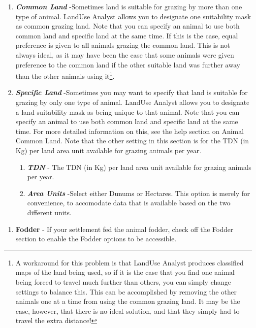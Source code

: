 \begin{enumerate}
      \begin{enumerate}
        \item \textit{\textbf{Common Land}} -Sometimes land is suitable for
grazing by more than one type of animal. LandUse Analyst allows you to designate
one suitability mask as common grazing land. Note that you can specify an animal
to use both common land and specific land at the same time. If this is the case,
equal preference is given to all animals grazing the common land. This is not
always ideal, as it may have been the case that some animals were given
preference to the common land if the other suitable land was further away than
the other animals using it\footnote{A workaround for this problem is that
LandUse Analyst produces classified maps of the land being used, so if it is the
case that you find one animal being forced to travel much further than others,
you can simply change settings to balance this. This can be accomplished by
removing the other animals one at a time from using the common grazing land. It
may be the case, however, that there is no ideal solution, and that they simply
had to travel the extra distance!}.
        \item \textit{\textbf{Specific Land}} -Sometimes you may want to specify
that land is suitable for grazing by only one type of animal. LandUse Analyst
allows you to designate a land suitability mask as being unique to that animal.
Note that you can specify an animal to use both common land and specific land at
the same time. For more detailed information on this, see the help section on
Animal Common Land.   Note that the other setting in this section is for the TDN
(in Kg) per land area unit available for grazing animals per year.
          \begin{enumerate}
            \item \textit{\textbf{TDN}} - The TDN (in Kg) per land area unit
available for grazing animals per year.
            \item \textit{\textbf{Area Units}} -Select either Dunums or
Hectares. This option is merely for convenience, to accomodate data that is
available based on the two different units.
          \end{enumerate}
      \end{enumerate}
  \begin{enumerate}
    \item \textbf{Fodder} - If your settlement fed the animal fodder, check off
the Fodder section to enable the Fodder options to be accessible. 
      \begin{enumerate}

\end{enumerate}
\end{enumerate}
\end{enumerate}
